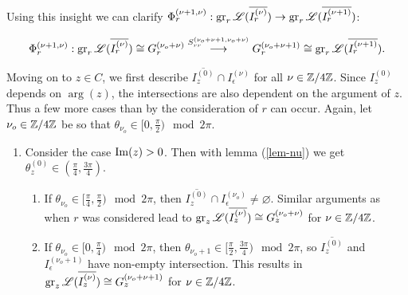 Using this insight we can clarify $\Phi_r^{(\nu+1,\nu)}: \operatorname{gr}_r\mathscr{L}(\overline{I_r^{(\nu)}}) \to \operatorname{gr}_r\mathscr{L}(\overline{I_r^{(\nu+1)}})$:

\[
\Phi_{r}^{(\nu+1,\nu)}:\operatorname{gr}_r\mathscr{L}(\overline{I_r^{(\nu)}}) \cong  G_r^{(\nu_o + \nu)} \overset{S_{rr}^{(\nu_o+\nu+1, \nu_o+\nu)}}{\longrightarrow} G_r^{(\nu_o+\nu+1)}  \cong \operatorname{gr}_r\mathscr{L}(\overline{I_r^{(\nu+1)}}).
\]

Moving on to $z \in C$, we first describe $\overline{I_z^{(0)}}\cap I^{(\nu)}_\epsilon$ for all $\nu \in \mathbb{Z}/4\mathbb{Z}$.
Since $I_z^{(0)}$ depends on $\arg(z)$, the intersections are also dependent on the argument of $z$. Thus a few more cases than by the consideration of $r$ can occur. Again, let $\nu_o \in \mathbb{Z}/4\mathbb{Z}$ be so that $\theta_{\nu_o} \in [0,\frac{\pi}{2}) \mod 2\pi$.
\begin{enumerate}
    \item Consider the case $\operatorname{Im}(z) > 0$. Then with lemma (\ref{lem-nu}) we get $\theta_z^{(0)} \in \left(\frac{\pi}{4}, \frac{3\pi}{4}\right)$.
        \begin{enumerate}
            \item If $\theta_{\nu_o} \in [\frac{\pi}{4},\frac{\pi}{2}) \mod 2\pi$, then $\overline{I_z^{(0)}} \cap I^{(\nu_o)}_\epsilon \neq \varnothing$. Similar arguments as when $r$ was considered lead to $\operatorname{gr}_z\mathscr{L}(\overline{I_z^{(\nu)}}) \cong G^{(\nu_o +\nu)}_z$ for $\nu \in \mathbb{Z}/4\mathbb{Z}$.
            \item If $\theta_{\nu_o} \in [0,\frac{\pi}{4}) \mod 2\pi$, then $\theta_{\nu_o+1} \in [\frac{\pi}{2}, \frac{3\pi}{4}) \mod 2\pi$, so $\overline{I_z^{(0)}}$ and $I^{(\nu_o+1)}_\epsilon$ have non-empty intersection. This results in $\operatorname{gr}_z\mathscr{L}(\overline{I_z^{(\nu)}}) \cong G^{(\nu_o+ \nu+1)}_z$ for $\nu \in \mathbb{Z}/4\mathbb{Z}$.
        \end{enumerate}

\begin{figure}[h!]
\begin{minipage}{0.48\textwidth}
\centering
{}
\end{minipage}
\end{figure}
\end{enumerate}
